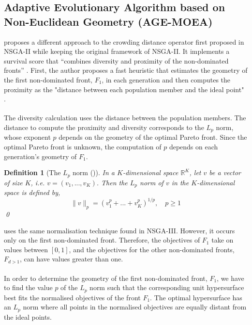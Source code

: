 \documentclass[mscthesis, 11pt]{usiinfthesis}
\theoremstyle{newdefinition}
\newtheorem{definition}{Definition}[section]
\begin{document}
\subsection{Adaptive Evolutionary Algorithm based on Non-Euclidean Geometry (AGE-MOEA)}\label{sec:agemoea}
\cite{panichella_adaptive_2019} proposes a different approach to the crowding distance operator first proposed in NSGA-II while keeping the original framework of NSGA-II. It implements a survival score that ``combines diversity and proximity of the non-dominated fronts'' \cite[~p.~596]{panichella_adaptive_2019}. First, the author proposes a fast heuristic that estimates the geometry of the first non-dominated front, $F_1$, in each generation and then computes the proximity as the "distance between each population member and the ideal point" \cite[~p.~596]{panichella_adaptive_2019}.
\\\\
The diversity calculation uses the distance between the population members. The distance to compute the proximity and diversity corresponds to the $L_p$ norm, whose exponent $p$ depends on the geometry of the optimal Pareto front. Since the optimal Pareto front is unknown, the computation of $p$ depends on each generation's geometry of $F_1$.
\begin{definition}[The $L_p$ norm (\cite{thompson_minkowski_1996})]
In a $K$-dimensional space $\mathbb{R}^K$, let $v$ be a vector of size $K$, i.e. $v = (v_1,...,v_K)$. Then the $L_p$ norm of $v$ in the $K$-dimensional space is defined by,
\begin{equation}
    \lVert v \rVert_p = (v_1^p + ... + v_K^p)^{1/p}, \quad p \geq 1
\end{equation}
\qed
\end{definition}

\cite[~p.~597]{panichella_adaptive_2019} uses the same normalisation technique found in NSGA-III. However, it occurs only on the first non-dominated front. Therefore, the objectives of $F_1$ take on values between $[0,1]$, and the objectives for the other non-dominated fronts, $F_{d > 1}$, can have values greater than one.
\\\\
In order to determine the geometry of the first non-dominated front, $F_1$, we have to find the value $p$ of the $L_p$ norm such that the corresponding unit hypersurface best fits the normalised objectives of the front $F_1$. The optimal hypersurface has an $L_p$ norm where all points in the normalised objectives are equally distant from the ideal points. 
\end{document}

